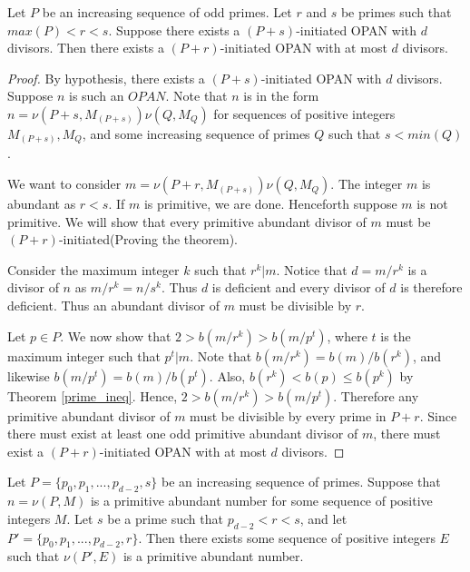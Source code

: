 \documentclass[../paper.tex]{subfiles}
\begin{document}


\begin{theorem}
\label{Divisibility}
Let $P$ be an increasing sequence of odd primes. Let $r$ and $s$ be
primes such that $max(P) < r < s$. Suppose there exists a $(P +
s)$-initiated OPAN with $d$ divisors. Then there exists a $(P +
r)$-initiated OPAN with at most $d$ divisors. 
\end{theorem}

\begin{proof}
By hypothesis, there exists a $(P + s)$-initiated OPAN with $d$ divisors.
Suppose $n$ is such an $OPAN$. Note that $n$ is in the form $n =
\nu(P + s, M_{(P + s)}) \nu(Q, M_Q)$ for sequences of positive 
integers $M_{(P + s)}, M_Q$, and some increasing sequence of
primes $Q$ such that $s < min(Q)$.

  We want to consider $m = \nu(P + r, M_{(P + s)}) \nu(Q, M_Q)$. 
The integer $m$ is abundant as $r < s$. If $m$ is primitive,
we are done. Henceforth suppose $m$ is not primitive. 
We will show that every primitive abundant divisor of $m$ must be 
$(P + r)$-initiated(Proving the theorem).

  Consider the maximum integer
$k$ such that $r^k | m$. Notice that $d = m / r^k$ is a divisor of $n$
as $m / r^k = n / s^k$. Thus $d$ is deficient and every divisor of
$d$ is therefore deficient. Thus an abundant divisor of $m$ must
be divisible by $r$.

Let $p \in P$.  We now show that $2 > b(m / r^k) > b(m / p^t)$, 
where $t$ is the maximum integer such that $p^t | m$. Note that
$b(m / r^k) = b(m) / b(r^k)$, and likewise $b(m / p^t) = b(m) /
b(p^t)$. Also, $b(r^k) < b(p) \leq b(p^k)$ by Theorem {\ref{prime_ineq}}. 
Hence, $2 > b(m / r^k) > b(m / p^t)$. Therefore any primitive
abundant divisor of $m$ must be divisible by every prime in 
$P + r$. Since there must exist at least one odd primitive 
abundant divisor of $m$, there must exist a $(P + r)$-initiated 
OPAN with at most $d$ divisors.
\end{proof}

\begin{coro}\label{Continuity}
Let $P = \{p_0, p_1, ..., p_{d-2}, s\}$ be an increasing sequence 
of primes. Suppose that $n = \nu(P, M)$ is a primitive abundant 
number for some sequence of positive integers $M$. Let $s$ be a 
prime such that $p_{d-2} < r < s$, and let $P' = \{p_0, p_1,...,
p_{d-2}, r\}$. Then there exists some sequence of positive integers
$E$ such that $\nu(P', E)$ is a primitive abundant number.
\end{coro}
\end{document}
